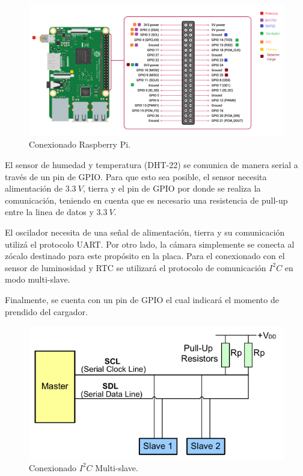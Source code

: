 \begin{figure}[H]
	\centering
	\includegraphics[width=0.9\linewidth]{ImagenesIngenieria de Detalle/Conexionado_rpi}		
	\caption{Conexionado Raspberry Pi.}
	\label{fig:conexionado_Rpi}
\end{figure}

El sensor de humedad y temperatura (DHT-22) se comunica de manera serial a través de un pin de GPIO. Para que esto sea posible, el sensor necesita alimentación de $3.3 \ V$, tierra y el pin de GPIO por donde se realiza la comunicación, teniendo en cuenta que es necesario una resistencia de pull-up entre la linea de datos y $3.3 \ V$.

El oscilador necesita de una señal de alimentación, tierra y su comunicación utilizá el protocolo UART. Por otro lado, la cámara simplemente se conecta al zócalo destinado para este propósito en la placa. Para el conexionado con el sensor de luminosidad y RTC se utilizará el protocolo de comunicación $I^2C$ en modo multi-slave.

Finalmente, se cuenta con un pin de GPIO el cual indicará el momento de prendido del cargador.

\begin{figure}[H]
	\centering
	\includegraphics[width=0.7\linewidth]{ImagenesIngenieria de Detalle/I2C_conexionado}	
	\caption{Conexionado $I^2C$ Multi-slave.}
	\label{fig:conexionado_i2c}
\end{figure}